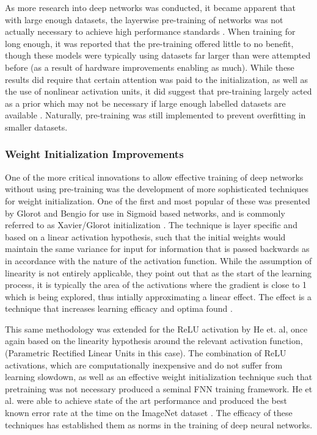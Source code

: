 \documentclass[a4paper,11pt,oneside]{article}
\theoremstyle{plain}
\theoremstyle{definition}
\begin{document}
	As more research into deep networks was conducted, it became apparent that with large enough datasets, the
	layerwise pre-training of networks was not actually necessary to achieve high performance standards 
	\cite{ImageNet, Glorot2, Ciresan}. When training for long enough, it was reported that the pre-training offered little to no 
	benefit, though these models were typically using datasets far larger than were attempted before (as a result of
	hardware improvements enabling as much). While these results did require that certain attention was paid to the 
	initialization, as well as the use of nonlinear activation units, it did suggest that pre-training largely acted as a prior 
	which may not be necessary if large enough labelled datasets are available \cite{Bengio3}. Naturally, pre-training was still 
	implemented to prevent overfitting in smaller datasets.
	\hfill \break 
	
	\subsubsection{Weight Initialization Improvements}\label{lr_weight_init}
	
	One of the more critical innovations to allow effective training of deep networks without using pre-training was the development of more sophisticated techniques for weight initialization. One of the first and most popular of these was presented by Glorot and Bengio for use in Sigmoid based networks, 
	and is commonly referred to as Xavier/Glorot initialization \cite{Glorot}. The technique is layer specific and based on a linear activation
	hypothesis, such that the initial weights would maintain the same variance for input for information that is passed backwards as in 
	accordance with the nature of the activation function. While the assumption of linearity is not entirely applicable, they point out that as the 
	start of the learning process, it is typically the area of the activations where the gradient is close to 1 which is being explored, thus intially approximating 
	a linear effect. The effect is a technique that increases learning efficacy and optima found \cite{Glorot}. \newline
	
	This same methodology was extended for the ReLU activation by He et. al, once again based on the linearity hypothesis around the 
	relevant activation function, (Parametric Rectified Linear Units in this case). The combination of ReLU activations, which are computationally inexpensive and do not suffer from learning slowdown, as well as an effective weight initialization technique such that pretraining was not necessary produced a seminal FNN training framework. He et al. were able to 
	achieve state of the art performance and produced the best known error rate at the time on the ImageNet dataset \cite{He}. The efficacy of these techniques has established 
	them as norms in the training of deep neural networks.
	
\end{document}

